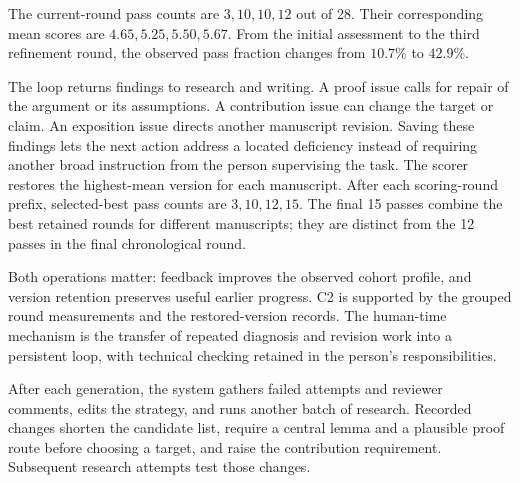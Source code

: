 The current-round pass counts are $3,10,10,12$ out of 28. Their corresponding mean scores are $4.65,5.25,5.50,5.67$. From the initial assessment to the third refinement round, the observed pass fraction changes from $10.7\%$ to $42.9\%$.

The loop returns findings to research and writing. A proof issue calls for repair of the argument or its assumptions. A contribution issue can change the target or claim. An exposition issue directs another manuscript revision. Saving these findings lets the next action address a located deficiency instead of requiring another broad instruction from the person supervising the task.
The scorer restores the highest-mean version for each manuscript. After each scoring-round prefix, selected-best pass counts are $3,10,12,15$. The final 15 passes combine the best retained rounds for different manuscripts; they are distinct from the 12 passes in the final chronological round.

Both operations matter: feedback improves the observed cohort profile, and version retention preserves useful earlier progress. C2 is supported by the grouped round measurements and the restored-version records. The human-time mechanism is the transfer of repeated diagnosis and revision work into a persistent loop, with technical checking retained in the person's responsibilities.


After each generation, the system gathers failed attempts and reviewer comments, edits the strategy, and runs another batch of research. Recorded changes shorten the candidate list, require a central lemma and a plausible proof route before choosing a target, and raise the contribution requirement. Subsequent research attempts test those changes.

